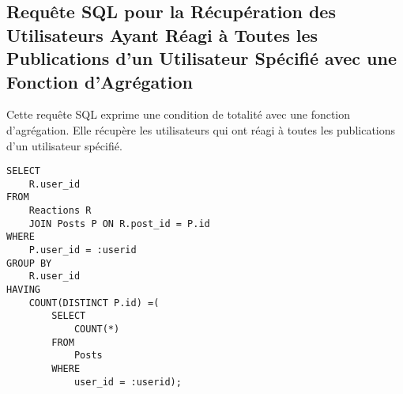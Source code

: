 \subsection{Requête SQL pour la Récupération des Utilisateurs Ayant Réagi à Toutes les Publications d'un Utilisateur Spécifié avec une Fonction d'Agrégation}

Cette requête SQL exprime une condition de totalité avec une fonction d'agrégation. Elle récupère les utilisateurs qui ont réagi à toutes les publications d'un utilisateur spécifié.

\begin{lstlisting}
SELECT
    R.user_id
FROM
    Reactions R
    JOIN Posts P ON R.post_id = P.id
WHERE
    P.user_id = :userid
GROUP BY
    R.user_id
HAVING
    COUNT(DISTINCT P.id) =(
        SELECT
            COUNT(*)
        FROM
            Posts
        WHERE
            user_id = :userid);
\end{lstlisting}